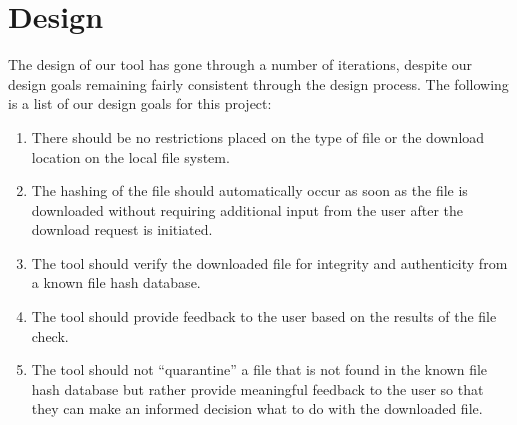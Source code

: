 \documentclass[letterpaper,twocolumn,10pt]{article}
\begin{document}
\section{Design}

The design of our tool has gone through a number of iterations, despite our design goals remaining fairly consistent through the design process. The following is a list of our design goals for this project:

\begin{enumerate}
\item There should be no restrictions placed on the type of file or the download location on the local file system.
\item The hashing of the file should automatically occur as soon as the file is downloaded without requiring additional input from the user after the download request is initiated.
\item The tool should verify the downloaded file for integrity and authenticity from a known file hash database.
\item The tool should provide feedback to the user based on the results of the file check.
\item The tool should not “quarantine” a file that is not found in the known file hash database but rather provide meaningful feedback to the user so that they can make an informed decision what to do with the downloaded file.
\end{enumerate}
\end{document}
